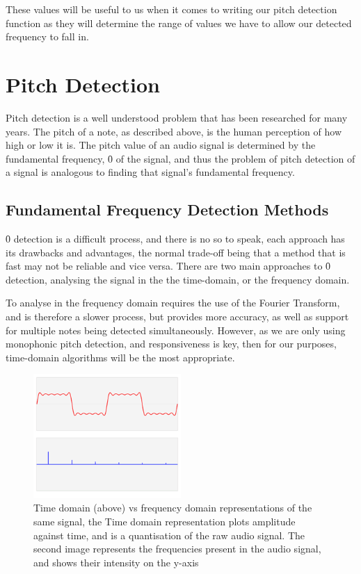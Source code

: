 	These values will be useful to us when it comes to writing our pitch detection function as they will determine the range of values we have to allow our detected frequency to fall in.
	
	\section{Pitch Detection}
	\par
	Pitch detection is a well understood problem that has been researched for many years. The pitch of a note, as described above, is the human perception of how high or low it is. The pitch value of an audio signal is determined by the fundamental frequency, \f0 of the signal, and thus the problem of pitch detection of a signal is analogous to finding that signal's fundamental frequency. 
	
	\subsection{Fundamental Frequency Detection Methods}
	
	\f0 detection is a difficult process, and there is no  so to speak, each approach has its drawbacks and advantages, the normal trade-off being that a method that is fast may not be reliable and vice versa.
	There are two main approaches to \f0 detection, analysing the signal in the the time-domain, or the frequency domain. 
	\par
	To analyse in the frequency domain requires the use of the Fourier Transform, and is therefore a slower process, but provides more accuracy, as well as support for multiple notes being detected simultaneously. However, as we are only using monophonic pitch detection, and responsiveness is key, then for our purposes, time-domain algorithms will be the most appropriate.
	\begin{figure}[h!]
  		\caption{Time domain (above) vs frequency domain representations of the same signal, the Time domain representation plots amplitude against time, and is a quantisation of the raw audio signal. The second image represents the frequencies present in the audio signal, and shows their intensity on the y-axis}
  		\centering
    	\includegraphics[width=0.5\textwidth]{assets/time-frequency.png}
	\end{figure}


